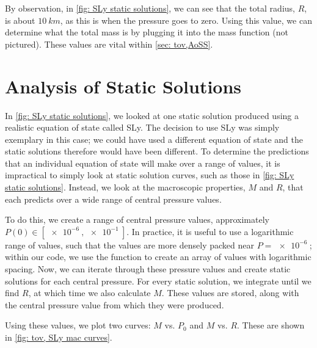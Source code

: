 By observation, in \autoref{fig: SLy static solutions}, we can see that the total radius, $R$, is about $\SI{10}{km}$, as this is when the pressure goes to zero. Using this value, we can determine what the total mass is by plugging it into the mass function (not pictured). These values are vital within \autoref{sec: tov,AoSS}.

\section{Analysis of Static Solutions}\label{sec: tov,AoSS}


In \autoref{fig: SLy static solutions}, we looked at one static solution produced using a realistic equation of state called SLy. The decision to use SLy was simply exemplary in this case; we could have used a different equation of state and the static solutions therefore would have been different. To determine the predictions that an individual equation of state will make over a range of values, it is impractical to simply look at static solution curves, such as those in \autoref{fig: SLy static solutions}. Instead, we look at the macroscopic properties, $M$ and $R$, that each predicts over a wide range of central pressure values.

To do this, we create a range of central pressure values, approximately $P(0)\in [\SI{e-6}{}, \SI{e-1}{}]$. In practice, it is useful to use a logarithmic range of values, such that the values are more densely packed near $P=\SI{e-6}{}$; within our code, we use the  function  to create an array of values with logarithmic spacing. Now, we can iterate through these pressure values and create static solutions for each central pressure. For every static solution, we integrate until we find $R$, at which time we also calculate $M$. These values are stored, along with the central pressure value from which they were produced.

Using these values, we plot two curves: $M$ vs. $P_0$ and $M$ vs. $R$. These are shown in \autoref{fig: tov, SLy mac curves}.

